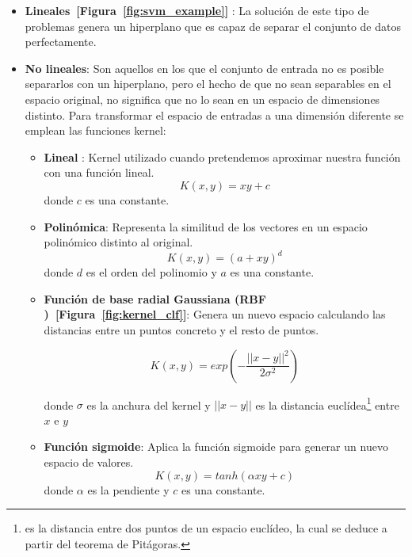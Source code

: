 \begin{itemize}
    \item \textbf{Lineales~[Figura~\ref{fig:svm_example}] } : La solución de este tipo de problemas genera un hiperplano que es capaz de separar el conjunto de datos perfectamente.
    
    \item \textbf{No lineales}: Son aquellos en los que el conjunto de entrada no es posible separarlos con un hiperplano, pero el hecho de que no sean separables en el espacio original, no significa que no lo sean en un espacio de dimensiones distinto. Para transformar el espacio de entradas a una dimensión diferente se emplean las funciones kernel:
    \begin{itemize}
    \item \textbf{Lineal} : Kernel utilizado cuando pretendemos aproximar nuestra función con una función lineal.
        \begin{equation}
            K(x,y) =  x y + c
        \end{equation}
        donde $c$ es una constante.
    \item \textbf{Polinómica}: Representa la similitud de los vectores en un espacio polinómico distinto al original.
        \begin{equation}
            K(x,y) = (a + xy)^d
        \end{equation}
    donde $d$ es el orden del polinomio y $a$ es una constante.

    \item \textbf{Función de base radial Gaussiana (RBF )~[Figura~\ref{fig:kernel_clf}]}: Genera un nuevo espacio calculando las distancias entre un puntos concreto y el resto de puntos.
    
    \begin{equation}
        K(x,y)=exp(- \frac{||x-y||^2}{2\sigma^2})
    \end{equation}
    
    donde $\sigma$ es la anchura del kernel y $||x-y||$ es la distancia euclídea\footnote{es la distancia entre dos puntos de un espacio euclídeo, la cual se deduce a partir del teorema de Pitágoras.} entre $x$ e $y$ 

    \item \textbf{Función sigmoide}: Aplica la función sigmoide para generar un nuevo espacio de valores.
        \begin{equation}
            K(x,y)=tanh(\alpha x y+ c)   
        \end{equation}
    donde $\alpha$ es la pendiente y $c$ es una constante.
    \end{itemize}
\end{itemize}



